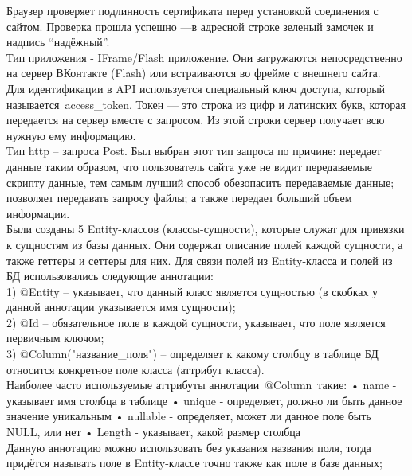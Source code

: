 \documentclass[a4paper]{article}
\begin{document}
\normalsize{Браузер проверяет подлинность сертификата перед установкой соединения с сайтом. Проверка прошла успешно —в адресной строке зеленый замочек и надпись “надёжный”.
}\\


\normalsize{Тип приложения - IFrame/Flash приложение. Они загружаются непосредственно на сервер ВКонтакте (Flash) или встраиваются во фрейме с внешнего сайта.
}\\


\normalsize{Для идентификации в API используется специальный ключ доступа, который называется access\_token. Токен — это строка из цифр и латинских букв, которая передается на сервер вместе с запросом. Из этой строки сервер получает всю нужную ему информацию.
}\\


\normalsize{Тип http – запроса Post. Был выбран этот тип запроса по причине: передает данные таким образом, что пользователь сайта уже не видит передаваемые скрипту данные, тем самым лучший способ обезопасить передаваемые данные; позволяет передавать запросу файлы; а также передает больший объем информации.
}\\


\normalsize{Были созданы 5 Entity-классов (классы-сущности), которые служат для привязки к сущностям из базы данных. Они содержат описание полей каждой сущности, а также геттеры и сеттеры для них. Для связи полей из Entity-класса и полей из БД использовались следующие аннотации:
}\\


\normalsize{1)	@Entity – указывает, что данный класс является сущностью (в скобках у данной аннотации указывается имя сущности);}\\


\normalsize{2)	@Id – обязательное поле в каждой сущности, указывает, что поле является первичным ключом;}\\


\normalsize{3)	@Column("название\_поля") – определяет к какому столбцу в таблице БД относится конкретное поле класса (аттрибут класса). }\\
\normalsize {Наиболее часто используемые аттрибуты аннотации @Column такие:
•	name - указывает имя столбца в таблице
•	unique - определяет, должно ли быть данное значение уникальным
•	nullable - определяет, может ли данное поле быть NULL, или нет
•	Length - указывает, какой размер столбца}\\
\normalsize {Данную аннотацию можно использовать без указания названия поля, тогда придётся называть поле в Entity-классе точно также как поле в базе данных;}\\
\end{document}
